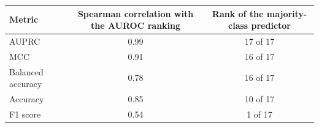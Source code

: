 \begin{tabular}{lcc}
\toprule
Metric & Spearman correlation with the AUROC ranking & Rank of the majority-class predictor \\
\midrule
AUPRC & 0.99 & 17 of 17 \\
MCC & 0.91 & 16 of 17 \\
Balanced accuracy & 0.78 & 16 of 17 \\
Accuracy & 0.85 & 10 of 17 \\
F1 score & 0.54 & 1 of 17 \\
\bottomrule
\end{tabular}